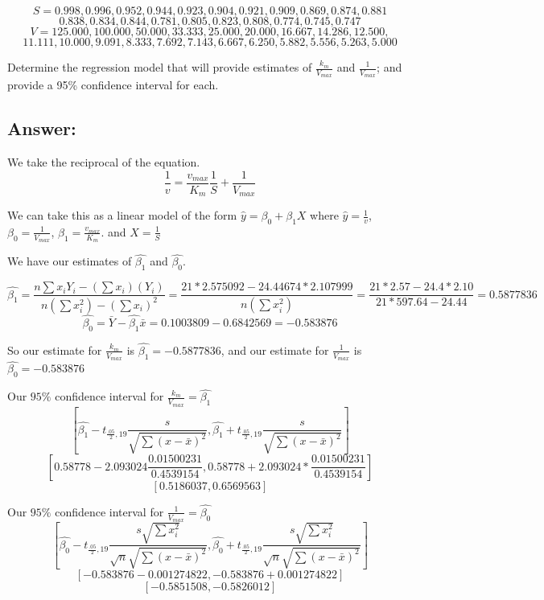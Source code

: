 \documentclass[svgnames]{article}
\begin{document}
$$ S =  0.998, 0.996, 0.952, 0.944, 0.923, 0.904, 0.921, 0.909, 0.869, 0.874, 0.881$$
$$ 0.838, 0.834, 0.844, 0.781, 0.805, 0.823, 0.808, 0.774, 0.745, 0.747$$
$$ V = 125.000, 100.000, 50.000, 33.333, 25.000, 20.000, 16.667, 14.286, 12.500,$$
$$11.111,10.000, 9.091, 8.333, 7.692, 7.143,6.667, 6.250, 5.882, 5.556, 5.263, 5.000$$

Determine the regression model that will provide estimates of $\frac{k_m}{V_{max}}$  and  $\frac{1}{V_{max}}$; and provide a 95\% confidence interval for each.
\subsection*{Answer:}

We take the reciprocal of the equation. 
$$\frac{1}{v} = \frac{v_{max}}{K_m}\frac{1}{S} + \frac{1}{V_{max}}$$

We can take this as a linear model of the form $\hat{y} = \beta_0 + \beta_1X$ where $\hat{y} = \frac{1}{v}$, $ \beta_0 =  \frac{1}{V_{max}}$,  $\beta_1=  \frac{v_{max}}{K_m}$. and $X=\frac{1}{S}$

We have our estimates of $\hat{\beta_1}$ and $\hat{\beta_0}$.

$$\hat{\beta_1} = \frac{n\sum x_i Y_i - (\sum x_i)(Y_i)}{n(\sum x_i^2) - (\sum x_i)^2} =  \frac{21 *2.575092 - 24.44674*2.107999}{n(\sum x_i^2)}  = \frac{21*2.57-24.4*2.10}{21*597.64 - 24.44} = 0.5877836$$
$$\hat{\beta_0} = \bar{Y} - \hat{\beta_1}\bar{x}= 0.1003809 - 0.6842569 = -0.583876 $$

So our estimate for $\frac{k_m}{V_{max}}$  is $\hat{\beta_1} = -0.5877836$, and our estimate for $\frac{1}{V_{max}}$ is $\hat{\beta_0} = -0.583876 $ \newline 

Our $95\%$ confidence interval for  $\frac{k_m}{V_{max}} = \hat{\beta_1}$
$$[\hat{\beta_1} - t_{\frac{.05}{2},19}\frac{s}{\sqrt{\sum(x-\bar{x})^2}}, \hat{\beta_1}  + t_{\frac{.05}{2},19}\frac{s}{\sqrt{\sum(x-\bar{x})^2}}]$$
$$[ 0.58778  -2.093024 \frac{0.01500231}{0.4539154},  0.58778+ 2.093024 * \frac{0.01500231}{0.4539154}]$$
$$[0.5186037,0.6569563]$$

Our $95\%$ confidence interval for  $\frac{1}{V_{max}} = \hat{\beta_0}$
$$[\hat{\beta_0} - t_{\frac{.05}{2},19}\frac{s\sqrt{\sum x_i^2}} {\sqrt{n}\sqrt{\sum(x-\bar{x})^2}},\hat{\beta_0} + t_{\frac{.05}{2},19}\frac{s\sqrt{\sum x_i^2}} {\sqrt{n}\sqrt{\sum(x-\bar{x})^2}} ]$$
$$[-0.583876 - 0.001274822, -0.583876 + 0.001274822]$$
$$[-0.5851508, -0.5826012]$$
\end{document}

